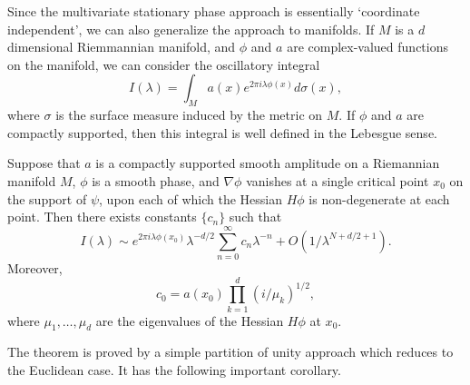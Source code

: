 Since the multivariate stationary phase approach is essentially `coordinate independent', we can also generalize the approach to manifolds. If $M$ is a $d$ dimensional Riemmannian manifold, and $\phi$ and $a$ are complex-valued functions on the manifold, we can consider the oscillatory integral
%
\[ I(\lambda) = \int_M a(x) e^{2 \pi i \lambda \phi(x)} d\sigma(x), \]
%
where $\sigma$ is the surface measure induced by the metric on $M$. If $\phi$ and $a$ are compactly supported, then this integral is well defined in the Lebesgue sense.

\begin{theorem}
  Suppose that $a$ is a compactly supported smooth amplitude on a Riemannian manifold $M$, $\phi$ is a smooth phase, and $\nabla \phi$ vanishes at a single critical point $x_0$ on the support of $\psi$, upon each of which the Hessian $H\phi$ is non-degenerate at each point. Then there exists constants $\{ c_n \}$ such that
  \[ I(\lambda) \sim e^{2 \pi i \lambda \phi(x_0)} \lambda^{-d/2} \sum_{n = 0}^\infty c_n \lambda^{-n} + O(1/\lambda^{N + d/2 + 1}). \]
  Moreover,
  \[ c_0 = a(x_0) \prod_{k = 1}^d (i/\mu_k)^{1/2}, \]
  where $\mu_1, \dots, \mu_d$ are the eigenvalues of the Hessian $H\phi$ at $x_0$.
\end{theorem}



The theorem is proved by a simple partition of unity approach which reduces to the Euclidean case. It has the following important corollary.

